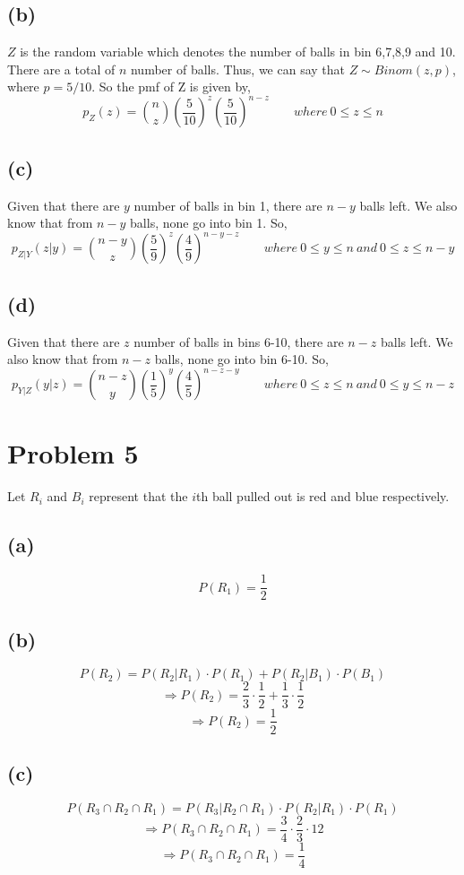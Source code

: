 \documentclass{article}
\begin{document}
		\subsection*{(b)}
		$Z$ is the random variable which denotes the number of balls in bin 6,7,8,9 and 10. There are a total of $n$ number of balls. Thus, we can say that $Z\sim Binom(z,p)$, where $p=5/10$.
		So the pmf of Z is given by,
		$$ p_Z(z) = {n \choose z} \left( \frac{5}{10} \right)^z \left( \frac{5}{10} \right)^{n-z} \; \; \; \; \; \; \; where\ 0\leq z \leq n $$

		\subsection*{(c)}
		Given that there are $y$ number of balls in bin 1, there are $n-y$ balls left. We also know that from $n-y$ balls, none go into bin 1. So,
		$$ p_{Z|Y}(z|y) = {n-y \choose z} \left( \frac{5}{9} \right)^z \left( \frac{4}{9} \right)^{n-y-z}  \; \; \; \; \; \; \; where\ 0\leq y \leq n \ and\ 0 \leq z \leq n-y $$

		\subsection*{(d)}
		Given that there are $z$ number of balls in bins 6-10, there are $n-z$ balls left. We also know that from $n-z$ balls, none go into bin 6-10. So,
		$$ p_{Y|Z}(y|z) = {n-z \choose y} \left( \frac{1}{5} \right)^y \left( \frac{4}{5} \right)^{n-z-y}  \; \; \; \; \; \; \; where\ 0\leq z \leq n \ and\ 0 \leq y \leq n-z $$

	\section*{Problem 5}
	Let $R_i$ and $B_i$ represent that the $i$th ball pulled out is red and blue respectively.
		\subsection*{(a)}
			$$ P(R_1) = \frac{1}{2} $$
		\subsection*{(b)}
			$$ P(R_2) = P(R_2|R_1) \cdot P(R_1) + P(R_2|B_1) \cdot P(B_1) $$
			$$ \Rightarrow P(R_2) = \frac{2}{3} \cdot \frac{1}{2} + \frac{1}{3} \cdot \frac{1}{2} $$
			$$ \Rightarrow P(R_2) = \frac{1}{2} $$
		\subsection*{(c)}
			$$ P(R_3 \cap R_2 \cap R_1) = P(R_3|R_2 \cap R_1) \cdot P(R_2|R_1) \cdot P(R_1) $$
			$$ \Rightarrow P(R_3 \cap R_2 \cap R_1) = \frac{3}{4} \cdot \frac{2}{3} \cdot {1}{2} $$
			$$ \Rightarrow P(R_3 \cap R_2 \cap R_1) = \frac{1}{4} $$
\end{document}
